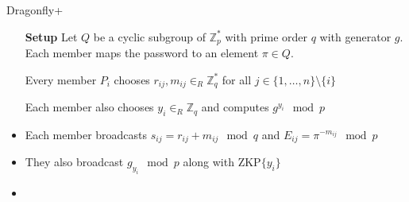 \documentclass{beamer}
\theoremstyle{definition}
\begin{document}




\begin{frame}{Dragonfly+}
    \begin{itemize}
        \item[\textbf{Setup}] Let $Q$ be a cyclic subgroup of $\mathbb{Z}_p^*$ with prime order $q$ with generator $g$.
            Each member maps the password to an element $\pi \in Q$.
        \item[] Every member $P_i$ chooses $r_{ij}, m_{ij} \in_R \mathbb{Z}_q^*$ for all $j \in \{1,\ldots,n\} \setminus \{i\}$
        \item[] Each member also chooses $y_i \in_R \mathbb{Z}_q$ and computes $g^{y_i} \mod p$
        
        \item<2->[\textbf{Rd 1}] Each member broadcasts $s_{ij} = r_{ij} + m_{ij} \mod q$ and $E_{ij} = \pi^{-m_{ij}} \mod p$
        \item<2->[] They also broadcast $g_{y_i} \mod p$ along with $\text{ZKP}\{y_i\}$
        \item<2->[] [All members verify the ZKP, verify $g_{z_i} \neq 1$ and check for reflection attacks]
    \end{itemize}
\end{frame}
\end{document}
